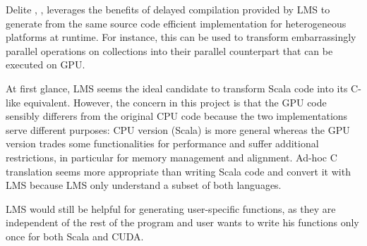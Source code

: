 Delite \cite{lms2}, \cite{lms3}, \cite{delite} leverages the benefits of delayed compilation provided by LMS to generate from the same source code efficient implementation for heterogeneous platforms at runtime. For instance, this can be used to transform embarrassingly parallel operations on collections into their parallel counterpart that can be executed on GPU.

At first glance, LMS seems the ideal candidate to transform Scala code into its C-like equivalent. However, the concern in this project is that the GPU code sensibly differers from the original CPU code because the two implementations serve different purposes: CPU version (Scala) is more general whereas the GPU version trades some functionalities for performance and suffer additional restrictions, in particular for memory management and alignment. Ad-hoc C translation seems more appropriate than writing Scala code and convert it with LMS because LMS only understand a subset of both languages.

LMS would still be helpful for generating user-specific functions, as they are independent of the rest of the program and user wants to write his functions only once for both Scala and CUDA.
